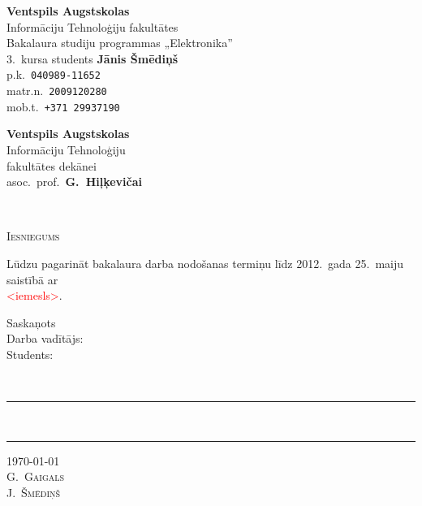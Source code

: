 \documentclass[10pt,a4paper]{article}
\begin{document}
	\sloppy
	\pagestyle{empty}
	\begin{minipage}[t]{0.47\textwidth}
		\begin{flushleft}
			\textbf{Ventspils Augstskolas}\\
			Informāciju Tehnoloģiju fakultātes\\
			Bakalaura studiju programmas „Elektronika”\\
			3.~kursa students \textbf{Jānis Šmēdiņš}\\
			p.k.~\texttt{040989-11652}\\
			matr.n.~\texttt{2009120280}\\
			mob.t.~\texttt{+371 29937190}
		\end{flushleft}
	\end{minipage}
	\begin{minipage}[t]{0.47\textwidth}
		\begin{flushright}
			\textbf{Ventspils Augstskolas}\\
			Informāciju Tehnoloģiju\\
			fakultātes dekānei\\
			asoc.~prof.~\textbf{G.~Hiļķevičai}
		\end{flushright}
	\end{minipage}\\[3em]
	
	\vspace{1cm}
	\begin{center}
		\Large\scshape Iesniegums
	\end{center}
	
	Lūdzu pagarināt bakalaura darba nodošanas termiņu 
	līdz 2012.~gada 25.~maiju saistībā ar \\ \textcolor{red}{<iemesls>}.
	
	\vspace{2cm}
	
	\begin{minipage}[t]{0.32\textwidth}
		\raggedright Saskaņots\\[3ex]
		Darba vadītājs:\\[3ex]
		Students:%
	\end{minipage}
	\begin{minipage}[t]{0.32\textwidth}
		\centering \hfill \\[3ex]
		\color{gray}\rule[-2pt]{10em}{1pt}\\[3ex]
		\color{gray}\rule[-2pt]{10em}{1pt}
	\end{minipage}
	\begin{minipage}[t]{0.32\textwidth}
		\raggedleft \today \\[3ex]
		\scshape 
		G.~Gaigals\\[3ex]
		J.~Šmēdiņš
	\end{minipage}
		
\end{document}
